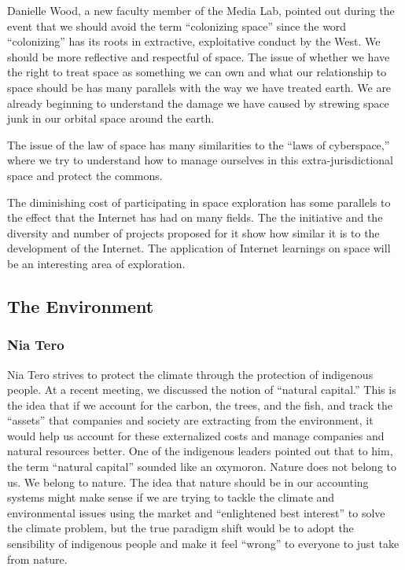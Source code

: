 Danielle Wood, a new faculty member of the Media Lab, pointed out during the event that we should avoid the term ``colonizing space'' since the word ``colonizing'' has its roots in extractive, exploitative conduct by the West. We should be more reflective and respectful of space. The issue of whether we have the right to treat space as something we can own and what our relationship to space should be has many parallels with the way we have treated earth. We are already beginning to understand the damage we have caused by strewing space junk in our orbital space around the earth.

The issue of the law of space has many similarities to the ``laws of cyberspace,'' where we try to understand how to manage ourselves in this extra-jurisdictional space and protect the commons.

The diminishing cost of participating in space exploration has some parallels to the effect that the Internet has had on many fields. The the initiative and the diversity and number of projects proposed for it show how similar it is to the development of the Internet. The application of Internet learnings on space will be an interesting area of exploration.

\subsection{The Environment}

\subsubsection{Nia Tero}

Nia Tero strives to protect the climate through the protection of indigenous people. At a recent meeting, we discussed the notion of ``natural capital.'' This is the idea that if we account for the carbon, the trees, and the fish, and track the ``assets'' that companies and society are extracting from the environment, it would help us account for these externalized costs and manage companies and natural resources better. One of the indigenous leaders pointed out that to him, the term ``natural capital'' sounded like an oxymoron. Nature does not belong to us. We belong to nature. The idea that nature should be in our accounting systems might make sense if we are trying to tackle the climate and environmental issues using the market and ``enlightened best interest'' to solve the climate problem, but the true paradigm shift would be to adopt the sensibility of indigenous people and make it feel ``wrong'' to everyone to just take from nature.

